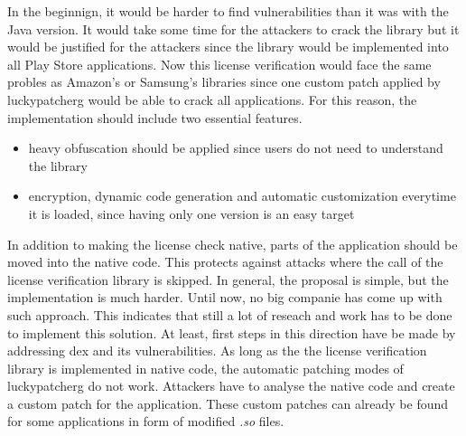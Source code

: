 In the beginnign, it would be harder to find vulnerabilities than it was with the Java version.
It would take some time for the attackers to crack the library but it would be justified for the attackers since the library would be implemented into all Play Store applications.
Now this license verification would face the same probles as Amazon's or Samsung's libraries since one custom patch applied by \gls{luckypatcherg} would be able to crack all applications.
For this reason, the implementation should include two essential features.
\begin{itemize}
\item heavy obfuscation should be applied since users do not need to understand the library
\item encryption, dynamic code generation and automatic customization everytime it is loaded, since having only one version is an easy target
\end{itemize}
In addition to making the license check native, parts of the application should be moved into the native code.
This protects against attacks where the call of the license verification library is skipped.
\newline
In general, the proposal is simple, but the implementation is much harder.
Until now, no big companie has come up with such approach.
This indicates that still a lot of reseach and work has to be done to implement this solution.
At least, first steps in this direction have be made by addressing dex and its vulnerabilities. \cite{munteanLicense}
\newline
As long as the the license verification library is implemented in native code, the automatic patching modes of \gls{luckypatcherg} do not work.
Attackers have to analyse the native code and create a custom patch for the application.
These custom patches can already be found for some applications in form of modified \textit{.so} files.
